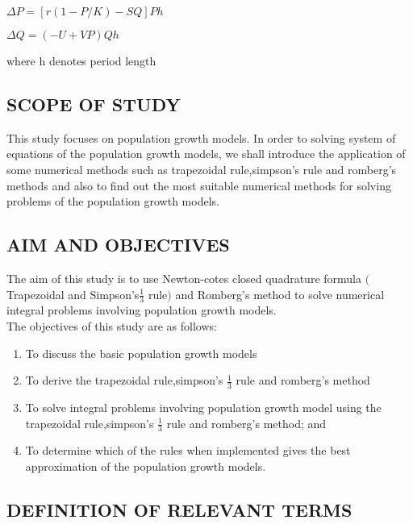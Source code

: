 \documentclass[a4paper,12pt]{report}
\numberwithin{equation}{section}
\begin{document}
\begin{center}
$\Delta P=[r(1-P/K)-SQ]Ph$
\end{center}
\begin{center}
$\Delta Q=(-U+VP)Qh$
\end{center}
where h denotes period length

         
\subsection{SCOPE OF STUDY}
\indent This study focuses on population growth models. In order to solving system of equations of the population growth models, we shall introduce the application of some numerical methods such as trapezoidal rule,simpson's rule and romberg's methods and also to find out the most suitable numerical methods for solving problems of the population growth models.
 
\subsection{AIM AND OBJECTIVES}
\indent The aim of this study is to use Newton-cotes closed quadrature formula $($Trapezoidal and Simpson's$\frac{1}{3}$ rule$)$ and Romberg's method to solve numerical integral problems involving population growth models.\\

The objectives of this study are as follows:
\begin{enumerate}
	\item To discuss the basic population growth models\\
	
	\item To derive the trapezoidal rule,simpson's $\frac{1}{3}$ rule and romberg's method\\
	
	\item To solve integral problems involving population growth model using the trapezoidal rule,simpson's $\frac{1}{3}$ rule and romberg's method; and\\
 
	
	\item To determine which of the rules when implemented gives the best approximation of the population growth models.
\end{enumerate}

\subsection{DEFINITION OF RELEVANT TERMS}
\end{document}
